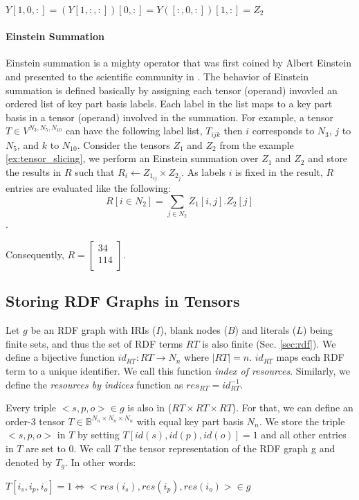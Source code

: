 \centerline{$Y[1, 0, :] = (Y[1, :, :])[0, :] = Y([:, 0, :])[1, :] = Z_2$}

\paragraph{Einstein Summation}
\label{einstein_summation}
Einstein summation is a mighty operator that was first coined by Albert Einstein and presented to the scientific community in \cite{einstein}. The behavior of Einstein summation is defined basically by assigning each tensor (operand) invovled an ordered list of key part basis labels. Each label in the list maps to a key part basis in a tensor (operand) involved in the summation. For example, a tensor $T \in V^{N_3, N_5, N_{10}}$ can have the following label list, $T_{ijk}$ then $i$ corresponds to $N_3$, $j$ to $N_{5}$, and $k$ to $N_{10}$. Consider the tensors $Z_1$ and $Z_2$ from the example \ref{ex:tensor_slicing}, we perform an Einstein summation over $Z_1$ and $Z_2$ and store the results in $R$ such that $R_{i} \gets Z_{1_{ij}} \times Z_{2_{j}}$. As labels $i$ is fixed in the result, $R$ entries are evaluated like the following: \[R[i \in N_2]  = \sum_{j \in N_2} Z_1[i, j]. Z_2[j]\].

Consequently, $R = \left[\begin{array}{cc}
34 \\ 114 \\
\end{array}\right]$.

\subsection{Storing RDF Graphs in Tensors}
\label{sec:rdf_tensor}
Let $g$ be an RDF graph with IRIs ($I$), blank nodes ($B$) and literals ($L$) being finite sets, and thus the set of RDF terms $RT$ is also finite (Sec. \ref{sec:rdf}). We define a bijective function $id_{RT}: RT \to N_n$ where $|RT|=n$. $id_{RT}$ maps each RDF term to a unique identifier. We call this function \textit{index of resources}.  Similarly, we define the \textit{resources by indices} function as $res_{RT} = id_{RT}^{-1}$. 

Every triple $<s, p, o> \in g$ is also in ($RT \times RT \times RT$). For that, we can define an order-3 tensor $T \in \mathbb{B}^{N_n \times N_n \times N_n}$ with equal key part basis $N_n$. We store the triple $<s, p, o>$ in $T$ by setting $T[id(s), id(p), id(o)] = 1$ and all other entries in $T$ are set to 0. We call $T$ the tensor representation of the RDF graph g and denoted by $T_g$. In other words: \\
\centerline{$T[i_s, i_p, i_o] = 1 \iff <res(i_s), res(i_p), res(i_o)> \in g$}

